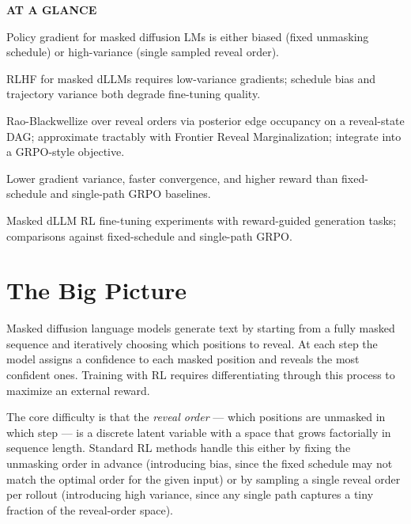 \documentclass[10pt,twocolumn]{article}
\begin{document}
\begin{mdframed}[backgroundcolor=boxgray,linecolor=rulered,linewidth=1pt,
    innerleftmargin=6pt,innerrightmargin=6pt,
    innertopmargin=6pt,innerbottommargin=6pt]
\textbf{\small AT A GLANCE}\par\vspace{4pt}
\begin{description}[leftmargin=0pt,labelsep=4pt,itemsep=2pt,parsep=0pt,
    font=\small\bfseries]
  \item[Problem:] Policy gradient for masked diffusion LMs is either biased
    (fixed unmasking schedule) or high-variance (single sampled reveal order).
  \item[Why it matters:] RLHF for masked dLLMs requires low-variance gradients;
    schedule bias and trajectory variance both degrade fine-tuning quality.
  \item[Method:] Rao-Blackwellize over reveal orders via posterior edge occupancy
    on a reveal-state DAG; approximate tractably with Frontier Reveal
    Marginalization; integrate into a GRPO-style objective.
  \item[Result:] Lower gradient variance, faster convergence, and higher reward
    than fixed-schedule and single-path GRPO baselines.
  \item[Evidence:] Masked dLLM RL fine-tuning experiments with reward-guided
    generation tasks; comparisons against fixed-schedule and single-path GRPO.
\end{description}
\end{mdframed}

\section{The Big Picture}

Masked diffusion language models generate text by starting from a fully masked
sequence and iteratively choosing which positions to reveal. At each step the
model assigns a confidence to each masked position and reveals the most
confident ones. Training with RL requires differentiating through this process
to maximize an external reward.

The core difficulty is that the \emph{reveal order} --- which positions are
unmasked in which step --- is a discrete latent variable with a space that
grows factorially in sequence length. Standard RL methods handle this either by
fixing the unmasking order in advance (introducing bias, since the fixed
schedule may not match the optimal order for the given input) or by sampling a
single reveal order per rollout (introducing high variance, since any single
path captures a tiny fraction of the reveal-order space).
\end{document}
